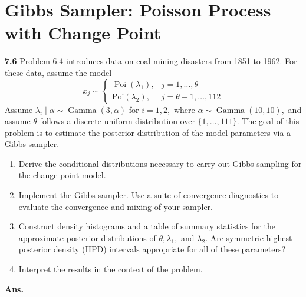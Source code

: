 \documentclass[11pt]{article}
\begin{document}
\section{Gibbs Sampler: Poisson Process with Change Point}
\textbf{7.6} Problem 6.4 introduces data on coal-mining disasters from 1851 to 1962. For these data, assume the model $$
x_{j} \sim\left\{\begin{array}{ll}
\operatorname{Poi}\left(\lambda_{1}\right), & j=1, \ldots, \theta \\
\text {Poi}\left(\lambda_{2}\right), & j=\theta+1, \ldots , 112
\end{array}\right.
$$
Assume $\lambda_{i} \mid \alpha \sim \operatorname{Gamma}(3, \alpha)$ for $i=1,2,$ where $\alpha \sim \operatorname{Gamma}(10,10),$ and assume $\theta$ follows a discrete uniform distribution over $\{1, \ldots, 111\} .$ The goal of this problem is to estimate the posterior distribution of the model parameters via a Gibbs sampler.
\begin{enumerate}
    \item Derive the conditional distributions necessary to carry out Gibbs sampling for the change-point model.
    \item Implement the Gibbs sampler. Use a suite of convergence diagnostics to evaluate the convergence and mixing of your sampler.
    \item Construct density histograms and a table of summary statistics for the approximate posterior distributions of $\theta, \lambda_{1},$ and $\lambda_{2} .$ Are symmetric highest posterior density (HPD) intervals appropriate for all of these parameters?
    \item Interpret the results in the context of the problem.
\end{enumerate}
\textbf{Ans.}
\end{document}
